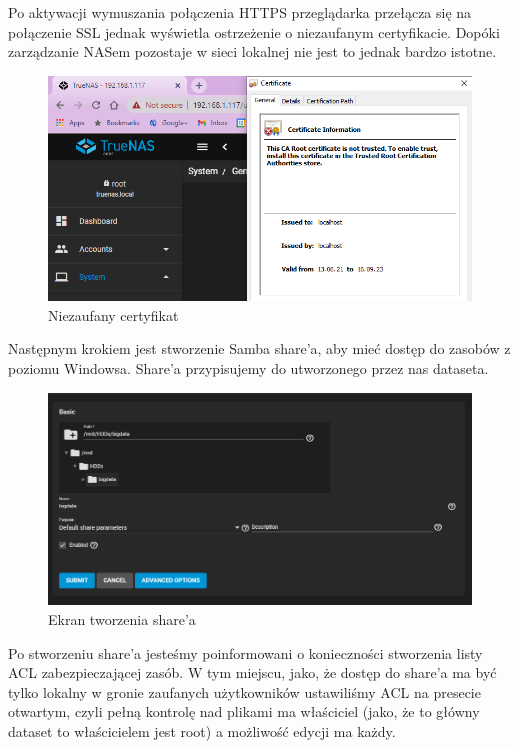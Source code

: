 \documentclass[12pt,a4paper]{article}
\newcommand{\<}{\langle}
\renewcommand{\>}{\rangle}
\theoremstyle{definition}
\begin{document}
Po aktywacji wymuszania połączenia HTTPS przeglądarka przełącza się na połączenie SSL jednak wyświetla ostrzeżenie o niezaufanym certyfikacie. Dopóki zarządzanie NASem pozostaje w sieci lokalnej nie jest to jednak bardzo istotne.

\begin{figure}[H]
    \centering
    \includegraphics[width=\linewidth]{img/ss_truenas/34.png}
    \caption{Niezaufany certyfikat}
    \label{certificate}
\end{figure}

Następnym krokiem jest stworzenie Samba share'a, aby mieć dostęp do zasobów z poziomu Windowsa. Share'a przypisujemy do utworzonego przez nas dataseta.

\begin{figure}[H]
    \centering
    \includegraphics[width=\linewidth]{img/ss_truenas/38.png}
    \caption{Ekran tworzenia share'a}
    \label{users_list}
\end{figure}

Po stworzeniu share'a jesteśmy poinformowani o konieczności stworzenia listy ACL zabezpieczającej zasób. W tym miejscu, jako, że dostęp do share'a ma być tylko lokalny w gronie zaufanych użytkowników ustawiliśmy ACL na presecie otwartym, czyli pełną kontrolę nad plikami ma właściciel (jako, że to główny dataset to właścicielem jest root) a możliwość edycji ma każdy.
\end{document}
